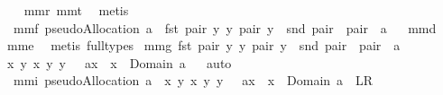 \begin{isabellebody}
\isadelimproof
\ %
\endisadelimproof
%
\isatagproof
{}\isamarkupfalse%
\ mm{}{}r\ mm{}{}t\ \isamarkupfalse%
\ metis%
\endisatagproof
{\isafoldproof}%
%
\isadelimproof
%
\endisadelimproof
\ \isanewline
\isanewline
\isanewline
{}\isamarkupfalse%
\ mm{}{}f{\isacharcolon}\ {\isachardoublequoteopen}pseudoAllocation\ a\ {\isacharequal}\ {\isacharbraceleft}{\isacharparenleft}fst\ pair{\isacharcomma}\ {\isacharbraceleft}y{\isacharbraceright}{\isacharparenright}{\isacharbar}\ y\ pair{\isachardot}\ y\ {\isasymin}\ snd\ pair\ {\isacharampersand}\ pair\ {\isasymin}\ a{\isacharbraceright}{\isachardoublequoteclose}%
\isadelimproof
\ %
\endisadelimproof
%
\isatagproof
{}\isamarkupfalse%
\ mm{}{}d\ \isanewline
mm{}{}e\ \isamarkupfalse%
\ {\isacharparenleft}metis\ {\isacharparenleft}full{\isacharunderscore}types{\isacharparenright}{\isacharparenright}%
\endisatagproof
{\isafoldproof}%
%
\isadelimproof
%
\endisadelimproof
\isanewline
{}\isamarkupfalse%
\ mm{}{}g{\isacharcolon}\ {\isachardoublequoteopen}{\isacharbraceleft}{\isacharparenleft}fst\ pair{\isacharcomma}\ {\isacharbraceleft}y{\isacharbraceright}{\isacharparenright}{\isacharbar}\ y\ pair{\isachardot}\ y\ {\isasymin}\ snd\ pair\ {\isacharampersand}\ pair\ {\isasymin}\ a{\isacharbraceright}{\isacharequal}\isanewline
{\isacharbraceleft}{\isacharparenleft}x{\isacharcomma}\ {\isacharbraceleft}y{\isacharbraceright}{\isacharparenright}{\isacharbar}\ x\ y{\isachardot}\ y\ {\isasymin}\ {\isasymUnion}\ {\isacharparenleft}a{\isacharbackquote}{\isacharbackquote}{\isacharbraceleft}x{\isacharbraceright}{\isacharparenright}\ {\isacharampersand}\ x\ {\isasymin}\ Domain\ a{\isacharbraceright}{\isachardoublequoteclose}%
\isadelimproof
\ %
\endisadelimproof
%
\isatagproof
{}\isamarkupfalse%
\ auto%
\endisatagproof
{\isafoldproof}%
%
\isadelimproof
%
\endisadelimproof
\isanewline
\isanewline
{}\isamarkupfalse%
\ mm{}{}i{\isacharcolon}\ {\isachardoublequoteopen}pseudoAllocation\ a\ {\isacharequal}\ {\isacharbraceleft}{\isacharparenleft}x{\isacharcomma}\ {\isacharbraceleft}y{\isacharbraceright}{\isacharparenright}{\isacharbar}\ x\ y{\isachardot}\ y\ {\isasymin}\ {\isasymUnion}\ {\isacharparenleft}a{\isacharbackquote}{\isacharbackquote}{\isacharbraceleft}x{\isacharbraceright}{\isacharparenright}\ {\isacharampersand}\ x\ {\isasymin}\ Domain\ a{\isacharbraceright}{\isachardoublequoteclose}\ {\isacharparenleft}\ {\isachardoublequoteopen}{\isacharquery}L{\isacharequal}{\isacharquery}R{\isachardoublequoteclose}{\isacharparenright}\isanewline

\end{isabellebody}
